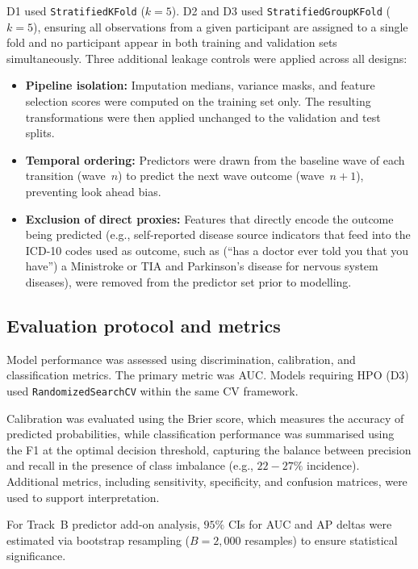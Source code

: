 D1 used \texttt{StratifiedKFold} ($k=5$). D2 and D3 used \texttt{StratifiedGroupKFold} ($k=5$), ensuring all observations from a given participant are assigned to a single fold and no participant appear in both training and validation sets simultaneously. Three additional leakage controls were applied across all designs:
\begin{itemize}
    \item \textbf{Pipeline isolation:} Imputation medians, variance masks, and feature selection scores were computed on the training set only. The resulting transformations were then applied unchanged to the validation and test splits.
    \item \textbf{Temporal ordering:} Predictors were drawn from the baseline wave of each transition (wave~$n$) to predict the next wave outcome (wave~$n+1$), preventing look ahead bias.
    \item \textbf{Exclusion of direct proxies:} Features that directly encode the outcome being predicted (e.g., self-reported disease source indicators that feed into the ICD-10 codes used as outcome, such as (``has a doctor ever told you that you have'') a Ministroke or TIA and Parkinson's disease for nervous system diseases), were removed from the predictor set prior to modelling.
\end{itemize}

\subsection{Evaluation protocol and metrics}
Model performance was assessed using discrimination, calibration, and classification metrics. The primary metric was \gls{AUC}. Models requiring \gls{HPO} (D3) used \texttt{RandomizedSearchCV} within the same \gls{CV} framework.

Calibration was evaluated using the Brier score, which measures the accuracy of predicted probabilities, while classification performance was summarised using the \gls{F1} at the optimal decision threshold, capturing the balance between precision and recall in the presence of class imbalance (e.g., $22-27\%$ incidence). Additional metrics, including sensitivity, specificity, and confusion matrices, were used to support interpretation.

For Track~B predictor add-on analysis, $95\%$ \gls{CI}s for \gls{AUC} and \gls{AP} deltas were estimated via bootstrap resampling ($B = 2{,}000$ resamples) to ensure statistical significance.

